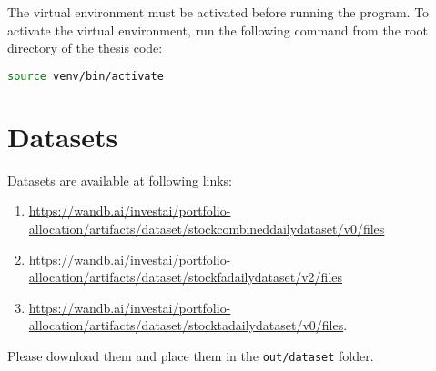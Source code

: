 \documentclass[../xlapes02]{subfiles}
\begin{document}
    The virtual environment must be activated before running the program. To activate the virtual environment, run the following command from the root directory of the thesis code:
    \begin{lstlisting}[language=bash]
source venv/bin/activate
    \end{lstlisting}


    \section{Datasets}

    Datasets are available at following links:
    \begin{enumerate}
        \item \url{https://wandb.ai/investai/portfolio-allocation/artifacts/dataset/stockcombineddailydataset/v0/files}
        \item \url{https://wandb.ai/investai/portfolio-allocation/artifacts/dataset/stockfadailydataset/v2/files}
        \item \url{https://wandb.ai/investai/portfolio-allocation/artifacts/dataset/stocktadailydataset/v0/files}.
    \end{enumerate}
    Please download them and place them in the \texttt{out/dataset} folder.
\end{document}
